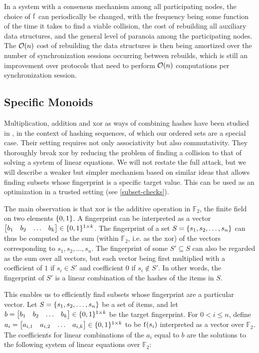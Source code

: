 In a system with a consensus mechanism among all participating nodes, the choice of $\operatorname{f}$ can periodically be changed, with the frequency being some function of the time it takes to find a viable collision, the cost of rebuilding all auxiliary data structures, and the general level of paranoia among the participating nodes. The $\mathcal{O}(n)$ cost of rebuilding the data structures is then being amortized over the number of synchronization sessions occurring between rebuilds, which is still an improvement over protocols that need to perform $\mathcal{O}(n)$ computations per synchronization session.

\subsection{Specific Monoids}
\label{specific-monoids}

Multiplication, addition and xor as ways of combining hashes have been studied in \cite{bellare1997new}, in the context of hashing sequences, of which our ordered sets are a special case. Their setting requires not only associativity but also commutativity. They thoroughly break xor by reducing the problem of finding a collision to that of solving a system of linear equations. We will not restate the full attack, but we will describe a weaker but simpler mechanism based on similar ideas that allows finding subsets whose fingerprint is a specific target value. This can be used as an optimization in a trusted setting (see \cref{subset-checks}).

The main observation is that xor is the additive operation in $\mathds{F}_2$, the finite field on two elements $\{0, 1\}$. A fingerprint can be interpreted as a vector $\begin{bmatrix}b_1 & b_2 & \ldots & b_k\end{bmatrix} \in \{0, 1\}^{1 \times k}$. The fingerprint of a set $S = \{s_1, s_2, \ldots, s_n\}$ can thus be computed as the sum (within $\mathds{F}_2$, i.e. as the xor) of the vectors corresponding to $s_1, s_2, \ldots, s_n$. The fingerprint of some $S' \subseteq S$ can also be regarded as the sum over all vectors, but each vector being first multiplied with a coefficient of $1$ if $s_i \in S'$ and coefficient $0$ if $s_i \notin S'$. In other words, the fingerprint of $S'$ is a linear combination of the hashes of the items in $S$.

This enables us to efficiently find subsets whose fingerprint are a particular vector. Let $S = \{s_1, s_2, \ldots, s_n\}$ be a set of items, and let $b = \begin{bmatrix}b_1 & b_2 & \ldots & b_k\end{bmatrix} \in \{0, 1\}^{1 \times k}$ be the target fingerprint. For $0 < i \leq n$, define $a_i = \begin{bmatrix}a_{i, 1} & a_{i, 2} & \ldots & a_{i, k}\end{bmatrix} \in \{0, 1\}^{1 \times k}$ to be $\operatorname{f}(s_i)$ interpreted as a vector over $\mathds{F}_2$. The coefficients for linear combinations of the $a_i$ equal to $b$ are the solutions to the following system of linear equations over $\mathds{F}_2$:

